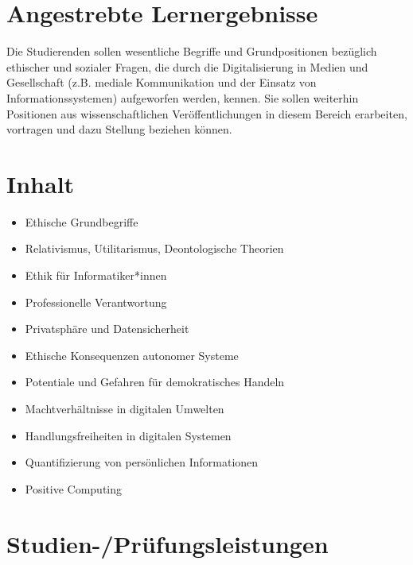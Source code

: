 \section*{Angestrebte
Lernergebnisse\label{/mi-2017/modulbeschreibungen-master/MA_All_Computerethik}}\label{angestrebte-lernergebnissepathlabelmi-2017modulbeschreibungen-mastermaux5fallux5fcomputerethik}

Die Studierenden sollen wesentliche Begriffe und Grundpositionen
bezüglich ethischer und sozialer Fragen, die durch die Digitalisierung
in Medien und Gesellschaft (z.B. mediale Kommunikation und der Einsatz
von Informationssystemen) aufgeworfen werden, kennen. Sie sollen
weiterhin Positionen aus wissenschaftlichen Veröffentlichungen in diesem
Bereich erarbeiten, vortragen und dazu Stellung beziehen können.

\section*{Inhalt\label{/mi-2017/modulbeschreibungen-master/MA_All_Computerethik}}\label{inhaltpathlabelmi-2017modulbeschreibungen-mastermaux5fallux5fcomputerethik}

\begin{itemize}
\tightlist
\item
  Ethische Grundbegriffe
\item
  Relativismus, Utilitarismus, Deontologische Theorien
\item
  Ethik für Informatiker*innen
\item
  Professionelle Verantwortung
\item
  Privatsphäre und Datensicherheit
\item
  Ethische Konsequenzen autonomer Systeme
\item
  Potentiale und Gefahren für demokratisches Handeln
\item
  Machtverhältnisse in digitalen Umwelten
\item
  Handlungsfreiheiten in digitalen Systemen
\item
  Quantifizierung von persönlichen Informationen
\item
  Positive Computing
\end{itemize}

\section*{Studien-/Prüfungsleistungen\label{/mi-2017/modulbeschreibungen-master/MA_All_Computerethik}}\label{studien-pruxfcfungsleistungenpathlabelmi-2017modulbeschreibungen-mastermaux5fallux5fcomputerethik}

